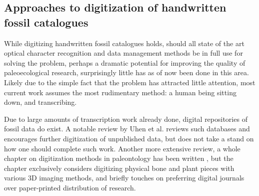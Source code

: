 \documentclass{article}
\begin{document}
\subsection{Approaches to digitization of handwritten fossil catalogues}
\label{sect:related_same_problem}

While digitizing handwritten fossil catalogues holds,
should all state of the art optical character recognition and data management methods 
be in full use for solving the problem, perhaps a dramatic potential for improving 
the quality of paleoecological research, surprisingly little has as of now been done in this area.
Likely due to the simple fact that the problem has attracted little attention, 
most current work assumes the most rudimentary method: a human 
being sitting down, and transcribing.

Due to large amounts of transcription work already done, digital repositories of fossil data do exist. A notable review 
by Uhen et al. \cite{uhenCardCatalogsComputers2013} reviews such databases and encourages further 
digitization of unpublished data, but does not take a stand on how one should complete such work.
Another more extensive review, a whole chapter on digitization methods in paleontology has been written \cite{mallisonDigitizingMethodsPaleontology2011},
but the chapter exclusively considers digitizing physical bone and plant pieces with various 3D imaging methods, and briefly touches on preferring digital journals over 
paper-printed distribution of research.
\end{document}
